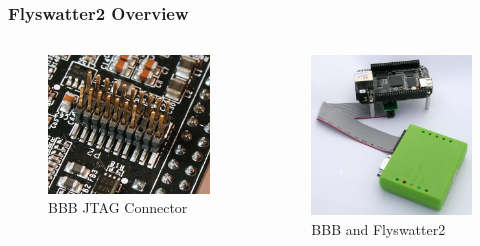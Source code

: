 \documentclass[aspectratio=169,usenames,dvipsnames]{beamer}
\begin{document}
\begin{frame}
  \frametitle{Flyswatter2 Overview}
  \begin{columns}
      \begin{figure}
        \centering
        \includegraphics[scale=0.3]{images/bbb-connector.jpg}
        \caption{BBB JTAG Connector}
      \end{figure}
      \begin{figure}
        \centering
        \includegraphics[scale=0.32]{images/bbb-and-flyswatter.jpg}
        \caption{BBB and Flyswatter2}
      \end{figure}
  \end{columns}
  \vspace*{-5mm}
\end{frame}
\end{document}
